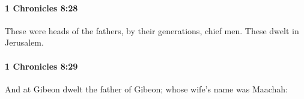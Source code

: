 		\paragraph{1 Chronicles 8:28} %
			\label{1CHRONICLES-8-28}

			These were heads of the fathers, by their generations, chief men. These dwelt in Jerusalem.


		\paragraph{1 Chronicles 8:29} %
			\label{1CHRONICLES-8-29}

			And at Gibeon dwelt the father of Gibeon; whose wife’s name was Maachah:


